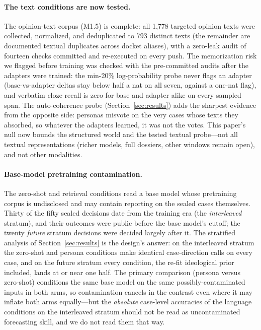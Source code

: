 \paragraph{The text conditions are now tested.}
The opinion-text corpus (M1.5) is complete: all 1{,}778 targeted
opinion texts were collected, normalized, and deduplicated to 793
distinct texts (the remainder are documented textual duplicates
across docket aliases), with a zero-leak audit of fourteen checks
committed and re-executed on every push. The memorization risk we
flagged before training was checked with the pre-committed audits
after the adapters were trained: the min-20\% log-probability probe
never flags an adapter (base-vs-adapter deltas stay below half a nat
on all seven, against a one-nat flag), and verbatim cloze recall is
zero for base and adapter alike on every sampled span. The
auto-coherence probe (Section~\ref{sec:results}) adds the sharpest
evidence from the opposite side: personas misvote on the very cases
whose texts they absorbed, so whatever the adapters learned, it was
not the votes. This paper's null now bounds the structured world and
the tested textual probe---not all textual representations (richer
models, full dossiers, other windows remain open), and not other
modalities.

\paragraph{Base-model pretraining contamination.}
The zero-shot and retrieval conditions read a base model whose
pretraining corpus is undisclosed and may contain reporting on the
sealed cases themselves. Thirty of the fifty sealed decisions date
from the training era (the \emph{interleaved} stratum), and their
outcomes were public before the base model's cutoff; the twenty
\emph{future} stratum decisions were decided largely after it. The
stratified analysis of Section~\ref{sec:results} is the design's
answer: on the interleaved stratum the zero-shot and persona
conditions make identical case-direction calls on every case, and on
the future stratum every condition, the re-fit ideological prior
included, lands at or near one half. The primary comparison
(persona versus zero-shot) conditions the same base model on the
same possibly-contaminated inputs in both arms, so contamination
cancels in the contrast even where it may inflate both arms
equally---but the \emph{absolute} case-level accuracies of the
language conditions on the interleaved stratum should not be read
as uncontaminated forecasting skill, and we do not read them that
way.

